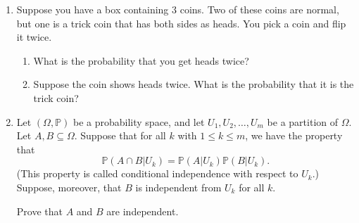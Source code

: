 \documentclass[12pt]{article}
\renewcommand{\P}{\mathbb{P}}
\newcommand{\p}[1]{\P\left(#1\right)}
\begin{document}
\begin{enumerate}
\item Suppose you have a box containing 3 coins. Two of these coins are normal, but one is a trick coin that has both sides as heads. You pick a coin and flip it twice.
\begin{enumerate}
\item What is the probability that you get heads twice?
\item Suppose the coin shows heads twice. What is the probability that it is the trick coin?
\end{enumerate}

\item Let $(\Omega, \P)$ be a probability space, and let $U_1, U_2, \dots, U_m$ be a partition of $\Omega$. Let $A, B\subseteq \Omega$. Suppose that for all $k$ with $1\leq k\leq m$, we have the property that
\[\p{A\cap B\vert U_k} = \p{A\vert U_k}\p{B\vert U_k}.\]
(This property is called conditional independence with respect to $U_k$.) Suppose, moreover, that $B$ is independent from $U_k$ for all $k$.

Prove that $A$ and $B$ are independent.
\end{enumerate}
\end{document}
